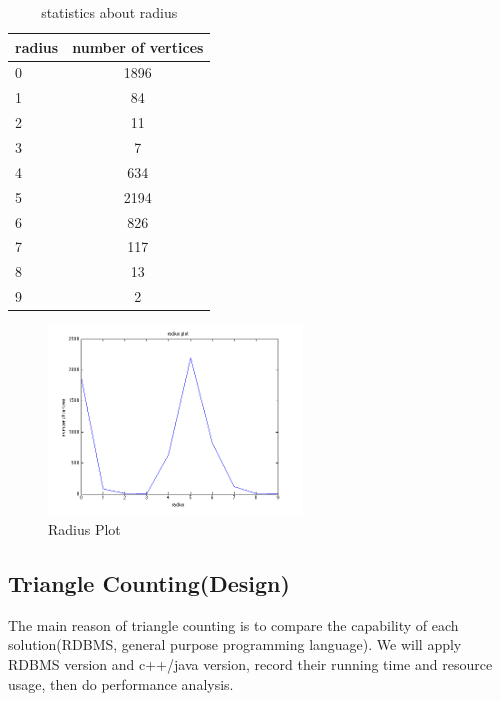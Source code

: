 \begin{table}
\begin{center}
\begin{tabular}{| l | c |}
  \hline                        
  radius & number of vertices  \\ \hline
  0 & 1896  \\ \hline
  1 & 84  \\ \hline
  2 & 11 \\ \hline
  3 & 7 \\ \hline  
  4 & 634 \\ \hline  
  5 & 2194 \\ \hline  
  6 & 826 \\ \hline  
  7 & 117 \\ \hline  
  8 & 13 \\ \hline
  9 & 2 \\ \hline   
\end{tabular}
\caption{statistics about radius}
\label{table:radius}
\end{center} 
\end{table}

\begin{figure}[htbf]
\begin{center}
     \includegraphics[width=0.6\textwidth]{FIG/radius.png}
\caption{Radius Plot}
\label{fig:radius}
\end{center}
\end{figure}

\subsection{Triangle Counting(Design)}
The main reason of triangle counting is to compare the capability of each solution(RDBMS, general purpose programming language). We will apply RDBMS version and c++/java version, record their running time and resource usage, then do performance analysis. 

